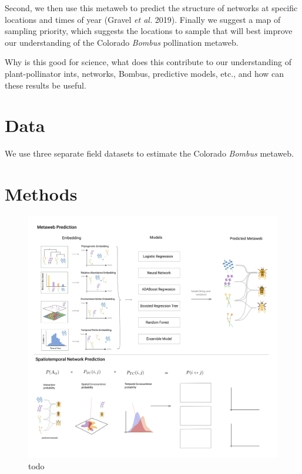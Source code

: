 \documentclass[11pt]{article}
\makeatletter
\def\maxwidth{\ifdim\Gin@nat@width>\linewidth\linewidth
\else\Gin@nat@width\fi}
\let\Oldincludegraphics\includegraphics
\renewcommand{\includegraphics}[1]{\Oldincludegraphics[width=\maxwidth]{#1}}
\makeatother
\begin{document}
Second, we then use this metaweb to predict the structure of networks at
specific locations and times of year (Gravel \emph{et al.} 2019).
Finally we suggest a map of sampling priority, which suggests the
locations to sample that will best improve our understanding of the
Colorado \emph{Bombus} pollination metaweb.

Why is this good for science, what does this contribute to our
understanding of plant-pollinator ints, networks, Bombus, predictive
models, etc., and how can these results be useful.

\hypertarget{data}{%
\section{Data}\label{data}}

We use three separate field datasets to estimate the Colorado
\emph{Bombus} metaweb.

\hypertarget{methods}{%
\section{Methods}\label{methods}}

\begin{figure}
\centering
\includegraphics{./figures/concept.png}
\caption{todo}
\end{figure}
\end{document}
